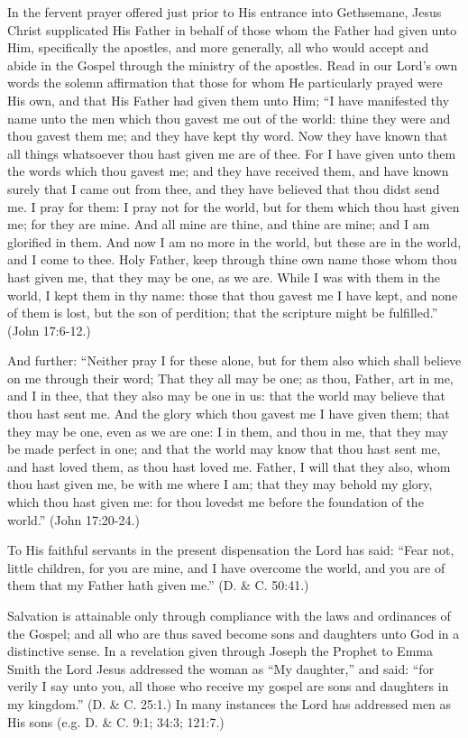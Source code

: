 In the fervent prayer offered just prior to His entrance into Gethsemane, Jesus Christ
supplicated His Father in behalf of those whom the Father had given unto Him, specifically
the apostles, and more generally, all who would accept and abide in the Gospel through the
ministry of the apostles. Read in our Lord's own words the solemn affirmation that those for
whom He particularly prayed were His own, and that His Father had given them unto Him; ``I
have manifested thy name unto the men which thou gavest me out of the world: thine they
were and thou gavest them me; and they have kept thy word. Now they have known that all
things whatsoever thou hast given me are of thee. For I have given unto them the words
which thou gavest me; and they have received them, and have known surely that I came out
from thee, and they have believed that thou didst send me. I pray for them: I pray not for the
world, but for them which thou hast given me; for they are mine. And all mine are thine, and
thine are mine; and I am glorified in them. And now I am no more in the world, but these are
in the world, and I come to thee. Holy Father, keep through thine own name those whom
thou hast given me, that they may be one, as we are. While I was with them in the world, I
kept them in thy name: those that thou gavest me I have kept, and none of them is lost, but
the son of perdition; that the scripture might be fulfilled.'' (John 17:6-12.)

And further: ``Neither pray I for these alone, but for them also which shall believe on me
through their word; That they all may be one; as thou, Father, art in me, and I in thee, that
they also may be one in us: that the world may believe that thou hast sent me. And the glory
which thou gavest me I have given them; that they may be one, even as we are one: I in them,
and thou in me, that they may be made perfect in one; and that the world may know that thou
hast sent me, and hast loved them, as thou hast loved me. Father, I will that they also, whom
thou hast given me, be with me where I am; that they may behold my glory, which thou hast
given me: for thou lovedst me before the foundation of the world.'' (John 17:20-24.)

To His faithful servants in the present dispensation the Lord has said: ``Fear not, little
children, for you are mine, and I have overcome the world, and you are of them that my
Father hath given me.'' (D. \& C. 50:41.)

Salvation is attainable only through compliance with the laws and ordinances of the Gospel;
and all who are thus saved become sons and daughters unto God in a distinctive sense. In a
revelation given through Joseph the Prophet to Emma Smith the Lord Jesus addressed the
woman as ``My daughter,'' and said: ``for verily I say unto you, all those who receive my
gospel are sons and daughters in my kingdom.'' (D. \& C. 25:1.) In many instances the Lord
has addressed men as His sons (e.g. D. \& C. 9:1; 34:3; 121:7.)

